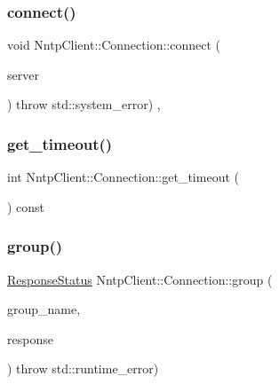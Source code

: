 \hypertarget{class_nntp_client_1_1_connection_afd86e34fcca569da32627d2b458caebf}{}\label{class_nntp_client_1_1_connection_afd86e34fcca569da32627d2b458caebf} 
\subsubsection{\texorpdfstring{connect()}{connect()}}
{\footnotesize\ttfamily void Nntp\+Client\+::\+Connection\+::connect (\begin{DoxyParamCaption}\item[{const \hyperlink{class_nntp_client_1_1_server_addr}{Server\+Addr} \&}]{server }\end{DoxyParamCaption}) throw  std\+::system\+\_\+error) \hspace{0.3cm}{\ttfamily [protected]}, {\ttfamily [virtual]}}

\hypertarget{class_nntp_client_1_1_connection_a4ff39dca9e9fa2c98a2d36bccfe2ddbf}{}\label{class_nntp_client_1_1_connection_a4ff39dca9e9fa2c98a2d36bccfe2ddbf} 
\subsubsection{\texorpdfstring{get\+\_\+timeout()}{get\_timeout()}}
{\footnotesize\ttfamily int Nntp\+Client\+::\+Connection\+::get\+\_\+timeout (\begin{DoxyParamCaption}{ }\end{DoxyParamCaption}) const}

\hypertarget{class_nntp_client_1_1_connection_a198e438060db29f7d6c990849d887d89}{}\label{class_nntp_client_1_1_connection_a198e438060db29f7d6c990849d887d89} 
\subsubsection{\texorpdfstring{group()}{group()}}
{\footnotesize\ttfamily \hyperlink{namespace_nntp_client_a920c73a4038b2a2c307245b909b43203}{Response\+Status} Nntp\+Client\+::\+Connection\+::group (\begin{DoxyParamCaption}\item[{const char $\ast$}]{group\+\_\+name,  }\item[{\hyperlink{class_nntp_client_1_1_response}{Response}}]{response }\end{DoxyParamCaption}) throw  std\+::runtime\+\_\+error) }

